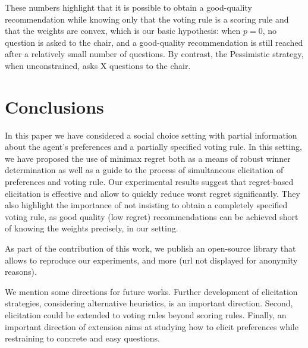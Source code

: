 \documentclass[sigconf, anonymous]{aamas}
\begin{document}
These numbers highlight that it is possible to obtain a good-quality recommendation while knowing only that the voting rule is a scoring rule and that the weights are convex, which is our basic hypothesis: when $p = 0$, no question is asked to the chair, and a good-quality recommendation is still reached after a relatively small number of questions. By contrast, the Pessimistic strategy, when unconstrained, asks X questions to the chair.

\section{Conclusions}  
\label{sec:conclusions}
In this paper we have considered a social choice setting with partial information about the agent's preferences and a partially specified voting rule.
In this setting, we have proposed the use of minimax regret both as a means of robust winner determination as well as a guide to the process of simultaneous elicitation of preferences and voting rule.
Our experimental results %
suggest that regret-based elicitation is effective and allow to quickly reduce worst regret significantly. They also highlight the importance of not insisting to obtain a completely specified voting rule, as good quality (low regret) recommendations can be achieved short of knowing the weights precisely, in our setting.

As part of the contribution of this work, we publish an open-source library that allows to reproduce our experiments, and more (url not displayed for anonymity reasons).

We mention some directions for future works.
Further development of elicitation strategies, considering alternative heuristics, is an important direction. 
Second, elicitation could be extended to voting rules beyond scoring rules. 
Finally, an important direction of extension aims at studying how to elicit preferences while restraining to concrete and easy questions.
\end{document}
